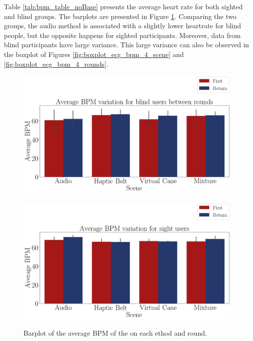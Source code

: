 Table \ref{tab:bpm_table_noBase} presents the average heart rate for both sighted and blind groups. The barplots are presented in Figure \ref{fig:barplot_ecg_bpm_4_scene_blind_sight}. Comparing the two groups, the audio method is associated with a slightly lower heartrate for blind people, but the opposite happens for sighted participants. Moreover, data from blind participants have large variance. This large variance can also be observed in the boxplot of Figures \ref{fig:boxplot_ecg_bpm_4_scene} and \ref{fig:boxplot_ecg_bpm_4_rounds}. 



\begin{figure}[!htb]
    \centering
    \begin{minipage}{\textwidth}
        \centering
        \includegraphics[width = 0.8\linewidth]{Resultados/ECG/Figuras/png/barplot_ecg_bpm_4_scene_blind.png}
        \label{fig:barplot_ecg_bpm_4_scene_blind}
    \end{minipage}
    \begin{minipage}{\textwidth}
        \centering
        \includegraphics[width = 0.8\linewidth]{Resultados/ECG/Figuras/png/barplot_ecg_bpm_4_scene_sight.png}
        \label{fig:barplot_ecg_bpm_4_scene_sight}
    \end{minipage}
    \caption{Barplot of the average BPM of the on each ethod and round.}
    \label{fig:barplot_ecg_bpm_4_scene_blind_sight}
\end{figure}

